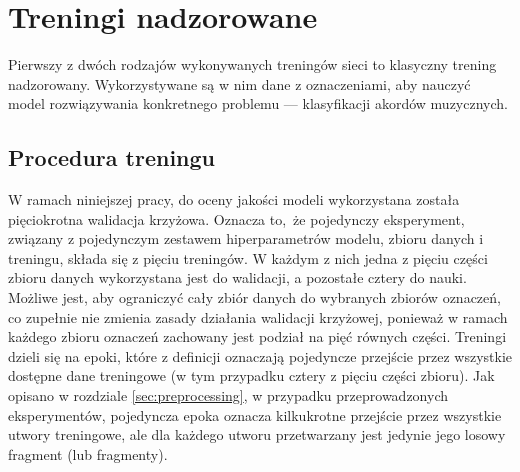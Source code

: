 \section{Treningi nadzorowane}

Pierwszy z dwóch rodzajów wykonywanych treningów sieci to klasyczny trening nadzorowany.
Wykorzystywane są w nim dane z oznaczeniami, aby nauczyć model rozwiązywania konkretnego problemu ---
klasyfikacji akordów muzycznych. 


\subsection{Procedura treningu}

W ramach niniejszej pracy, do oceny jakości modeli wykorzystana została pięciokrotna walidacja
krzyżowa. Oznacza to, że pojedynczy eksperyment, związany z pojedynczym zestawem hiperparametrów
modelu, zbioru danych i treningu, składa się z pięciu treningów. W każdym z nich jedna z pięciu
części zbioru danych wykorzystana jest do walidacji, a pozostałe cztery do nauki. Możliwe jest, aby
ograniczyć cały zbiór danych do wybranych zbiorów oznaczeń, co zupełnie nie zmienia zasady działania
walidacji krzyżowej, ponieważ w ramach każdego zbioru oznaczeń zachowany jest podział na pięć
równych części. Treningi dzieli się na epoki, które z definicji oznaczają pojedyncze przejście przez
wszystkie dostępne dane treningowe (w tym przypadku cztery z pięciu części zbioru). Jak opisano w
rozdziale \ref{sec:preprocessing}, w przypadku przeprowadzonych eksperymentów, pojedyncza epoka
oznacza kilkukrotne przejście przez wszystkie utwory treningowe, ale dla każdego utworu przetwarzany
jest jedynie jego losowy fragment (lub fragmenty).

